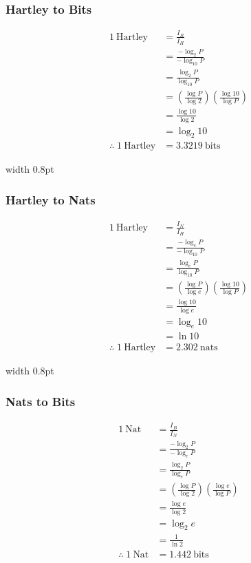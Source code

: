 \documentclass[11pt,a4paper]{book}
\begin{document}
\noindent
\begin{minipage}[t]{0.31\textwidth}
\subsubsection*{Hartley to Bits}
\begin{align*}
1~\text{Hartley}
&= \frac{I_B}{I_H} \\[6pt]
&= \frac{-\log_{2} P}{-\log_{10} P} \\[6pt]
&= \frac{\log_{2} P}{\log_{10} P} \\[6pt]
&= \left(\frac{\log P}{\log 2}\right)\left(\frac{\log 10}{\log P}\right) \\[6pt]
&= \frac{\log 10}{\log 2} \\[6pt]
&= \log_{2} 10 \\[6pt]
\therefore\;
1~\text{Hartley}
&= 3.3219~\text{bits}
\end{align*}
\end{minipage}
\hfill
\vrule width 0.8pt
\hfill
\begin{minipage}[t]{0.31\textwidth}
\subsubsection*{Hartley to Nats}
\begin{align*}
1~\text{Hartley}
&= \frac{I_N}{I_H} \\[6pt]
&= \frac{-\log_{e} P}{-\log_{10} P} \\[6pt]
&= \frac{\log_{e} P}{\log_{10} P} \\[6pt]
&= \left(\frac{\log P}{\log e}\right)\left(\frac{\log 10}{\log P}\right) \\[6pt]
&= \frac{\log 10}{\log e} \\[6pt]
&= \log_{e} 10 \\[6pt]
&= \ln 10 \\[6pt]
\therefore\;
1~\text{Hartley}
&= 2.302~\text{nats}
\end{align*}
\end{minipage}
\hfill
\vrule width 0.8pt
\hfill
\begin{minipage}[t]{0.31\textwidth}
\subsubsection*{Nats to Bits}
\begin{align*}
1~\text{Nat}
&= \frac{I_B}{I_N} \\[6pt]
&= \frac{-\log_{2} P}{-\log_{e} P} \\[6pt]
&= \frac{\log_{2} P}{\log_{e} P} \\[6pt]
&= \left(\frac{\log P}{\log 2}\right)\left(\frac{\log e}{\log P}\right) \\[6pt]
&= \frac{\log e}{\log 2} \\[6pt]
&= \log_{2} e \\[6pt]
&= \frac{1}{\ln 2} \\[6pt]
\therefore\;
1~\text{Nat}
&= 1.442~\text{bits}
\end{align*}
\end{minipage}
\end{document}
